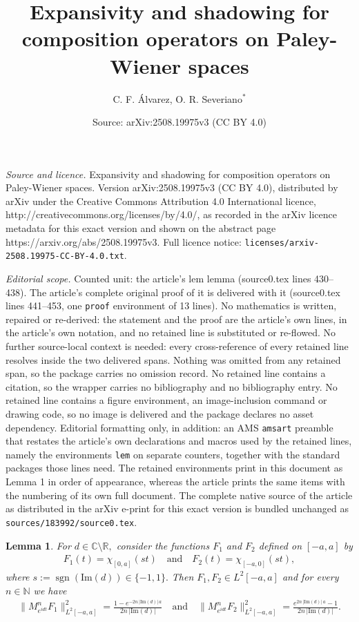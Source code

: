 \documentclass[10pt,a4paper]{amsart}
\title{Expansivity and shadowing for composition operators on Paley-Wiener spaces}
\author{C. F. \'{A}lvarez, O. R. Severiano$^{*}$}
\date{Source: arXiv:2508.19975v3 (CC BY 4.0)}
\newtheorem{lem}{Lemma}
\begin{document}
\maketitle

\noindent\emph{Source and licence.} Expansivity and shadowing for composition operators on Paley-Wiener spaces. Version arXiv:2508.19975v3 (CC BY 4.0), distributed by arXiv under the Creative Commons Attribution 4.0 International licence, http://creativecommons.org/licenses/by/4.0/, as recorded in the arXiv licence metadata for this exact version and shown on the abstract page https://arxiv.org/abs/2508.19975v3. Full licence notice: \texttt{licenses/arxiv-2508.19975-CC-BY-4.0.txt}.\par\smallskip

\noindent\textit{Editorial scope.} Counted unit: the article's lem lemma (source0.tex lines 430--438). The article's complete original proof of it is delivered with it (source0.tex lines 441--453, one \texttt{proof} environment of 13 lines). No mathematics is written, repaired or re-derived: the statement and the proof are the article's own lines, in the article's own notation, and no retained line is substituted or re-flowed.  No further source-local context is needed: every cross-reference of every retained line resolves inside the two delivered spans.  Nothing was omitted from any retained span, so the package carries no omission record.  No retained line contains a citation, so the wrapper carries no bibliography and no bibliography entry.  No retained line contains a figure environment, an image-inclusion command or drawing code, so no image is delivered and the package declares no asset dependency.  Editorial formatting only, in addition: an AMS \texttt{amsart} preamble that restates the article's own declarations and macros used by the retained lines, namely the environments \texttt{lem} on separate counters, together with the standard packages those lines need.  The retained environments print in this document as Lemma 1 in order of appearance, whereas the article prints the same items with the numbering of its own full document.  The complete native source of the article as distributed in the arXiv e-print for this exact version is bundled unchanged as \texttt{sources/183992/source0.tex}.
\begin{lem}\label{witness lemma}  For $d\in\mathbb{C}\setminus\mathbb{R},$  consider the functions $F_1$ and $F_2$ defined on $[-a,a]$ by
\begin{align*}
F_1(t)=\chi_{[0,a]}(st) \quad \text{and} \quad F_2(t)=\chi_{[-a,0]}(st),
\end{align*}
where $s:=\operatorname{sgn}(\mathrm{Im}(d))\in\{-1,1\}.$ Then $F_1,F_2\in L^2[-a,a]$ and for every $n\in \mathbb{N}$ we have 
\begin{align}\label{non-expansive}
\|M_{e^{idt}}^nF_1\|_{L^2[-a,a]}^{2}=\frac{1-e^{-2n\,|\mathrm{Im}(d)|\,a}}{2n\,|\mathrm{Im}(d)|} \quad \text{and} \quad \|M_{e^{idt}}^nF_2\|_{L^2[-a,a]}^{2}=\frac{e^{2n\,|\mathrm{Im}(d)|\,a}-1}{2n\,|\mathrm{Im}(d)|}.
\end{align}
\end{lem}
\end{document}
